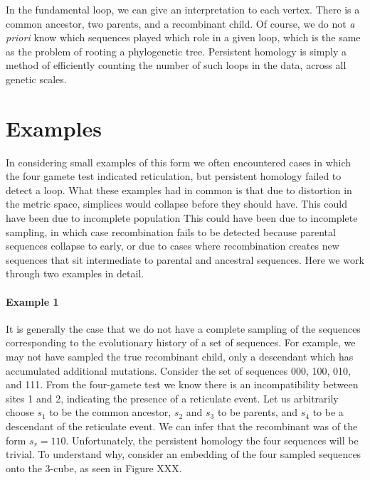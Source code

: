 In the fundamental loop, we can give an interpretation to each vertex.
There is a common ancestor, two parents, and a recombinant child.
Of course, we do not \emph{a priori} know which sequences played which role in a given loop, which is the same as the problem of rooting a phylogenetic tree.
Persistent homology is simply a method of efficiently counting the number of such loops in the data, across all genetic scales.

\section{Examples}
\label{sec:examples}

In considering small examples of this form we often encountered cases in which the four gamete test indicated reticulation, but persistent homology failed to detect a loop.
What these examples had in common is that due to distortion in the metric space, simplices would collapse before they should have.
This could have been due to incomplete population
This could have been due to incomplete sampling, in which case recombination fails to be detected because parental sequences collapse to early, or due to cases where recombination creates new sequences that sit intermediate to parental and ancestral sequences.
Here we work through two examples in detail.

\paragraph{Example 1}
\label{ex:example1}
%
It is generally the case that we do not have a complete sampling of the sequences corresponding to the evolutionary history of a set of sequences.
For example, we may not have sampled the true recombinant child, only a descendant which has accumulated additional mutations.
Consider the set of sequences 000, 100, 010, and 111.
From the four-gamete test we know there is an incompatibility between sites 1 and 2, indicating the presence of a reticulate event.
Let us arbitrarily choose $s_1$ to be the common ancestor, $s_2$ and $s_3$ to be parents, and $s_4$ to be a descendant of the reticulate event.
We can infer that the recombinant was of the form $s_r=110$.
Unfortunately, the persistent homology the four sequences will be trivial.
To understand why, consider an embedding of the four sampled sequences onto the 3-cube, as seen in Figure XXX.

